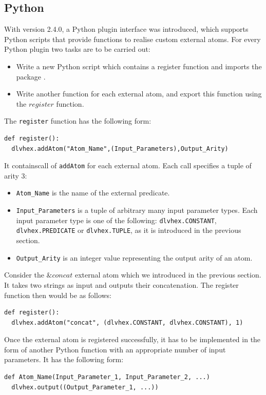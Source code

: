 \documentclass[a4paper, titlepage]{article}
\begin{document}
\subsection{Python}
With \dlvhex{} version 2.4.0, a Python plugin interface was 
introduced, which supports Python scripts that provide 
functions to realise custom external atoms. For every Python plugin two tasks are to be carried out:
\begin{itemize}
\item Write a new Python script which contains a register function and imports the package \dlvhex{}.
\item Write another function for each external atom, and export this function using the $\mathit{register}$ function. 
\end{itemize}
The \verb+register+ function has the following form:
\begin{verbatim} 
def register():
  dlvhex.addAtom("Atom_Name",(Input_Parameters),Output_Arity) 
\end{verbatim}
It containscall of \verb+addAtom+ for each external atom. Each call specifies a tuple of arity 3:
\begin{itemize}
\item \verb+Atom_Name+ is the name of the 
external predicate.
\item \verb+Input_Parameters+ is a tuple of arbitrary many input parameter types. Each input parameter type is one of the 
following: \verb+dlvhex.CONSTANT+, \verb+dlvhex.PREDICATE+ or 
\verb+dlvhex.TUPLE+, as it is introduced in the previous section.
\item \verb+Output_Arity+ is an integer value representing the output arity of an atom.  
\end{itemize}
Consider the $\mathit{\&concat}$ external atom which we introduced in the previous section. It takes two strings as input and outputs their concatenation. The register function then would be as follows:
\begin{verbatim}
def register():
  dlvhex.addAtom("concat", (dlvhex.CONSTANT, dlvhex.CONSTANT), 1)  
\end{verbatim}
Once the external atom is registered successfully, it has 
to be implemented in the form of another Python function 
with an appropriate number of input parameters. It has the 
following form:  
\begin{verbatim}
def Atom_Name(Input_Parameter_1, Input_Parameter_2, ...)
  dlvhex.output((Output_Parameter_1, ...))
\end{verbatim}
\end{document}
